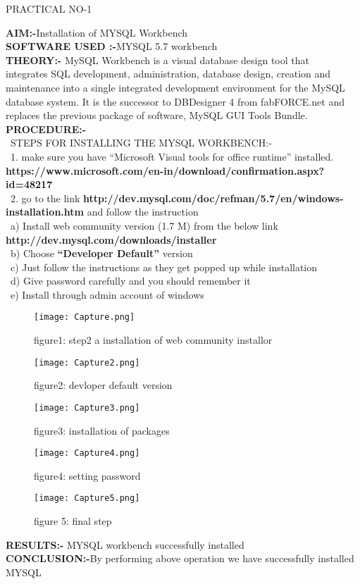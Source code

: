 \documentclass[a4paper,0pt]{article}
\begin{document}
\begin {center}
\textsc{\LARGE PRACTICAL NO-1 }\\
\end{center}
\textbf{ AIM:-}Installation of MYSQL Workbench\\[0.75cm]
\textbf{ SOFTWARE USED :-}MYSQL 5.7 workbench\\[0.75cm]
\textbf{THEORY:-} MySQL Workbench is a visual database design tool that \\integrates SQL development, administration, database design, creation and maintenance into a single  integrated development environment for the MySQL database system. It is the successor to DBDesigner 4 from fabFORCE.net and replaces the previous package of software, MySQL GUI Tools Bundle.\\[0.75cm]
\textbf{PROCEDURE:-}\\[0.5cm]
\ STEPS FOR INSTALLING THE MYSQL WORKBENCH:-\\[0.3cm]
\ 1. make sure you have “Microsoft Visual tools for office runtime” installed.\\[1mm]
 \textbf{ https://www.microsoft.com/en-in/download/confirmation.aspx?id=48217}\\[5mm]
 \ 2.  go to the link  \textbf{ http://dev.mysql.com/doc/refman/5.7/en/windows-installation.htm} and follow the instruction \\[1mm]
 \ a) Install web community version (1.7 M) from the below link\\[1mm]
 \textbf{ http://dev.mysql.com/downloads/installer}\\[2mm]
 \ b) Choose \textbf{“Developer Default”} version\\[2mm]
 \ c) Just follow the instructions as they get popped up while installation\\[2mm]
\ d) Give password carefully and you should remember it\\[2mm]
 \ e) Install through admin account of windows\\[0.75cm]
\begin{figure}
\texttt{[image: Capture.png]}
\centering
\caption{figure1: step2 a installation of web community installor}
\end{figure}
\begin{figure}
\texttt{[image: Capture2.png]}
\centering
\caption{figure2: devloper default version}
\end{figure}
\begin{figure}
\texttt{[image: Capture3.png]}
\centering
\caption{figure3: installation of packages }
\end{figure}
\begin{figure}
\texttt{[image: Capture4.png]}
\centering
\caption{figure4: setting password }
\end{figure}
\begin{figure}
\texttt{[image: Capture5.png]}
\centering
\caption{figure 5: final step }
\end{figure}
\newpage
\textbf{ RESULTS:-} MYSQL workbench successfully installed\\[5mm]
\textbf{CONCLUSION:-}By performing above operation we have successfully installed MYSQL\\
\newpage
\end{document}
